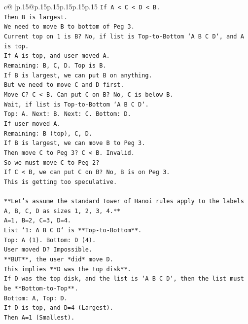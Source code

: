 \documentclass{article}
\begin{document}
{\begin{supertabular}{c@{$\;$}|p{.15\linewidth}@{}p{.15\linewidth}p{.15\linewidth}p{.15\linewidth}p{.15\linewidth}p{.15\linewidth}}
{{{\texttt{If A < C < D < B.} \\
\texttt{Then B is largest.} \\
\texttt{We need to move B to bottom of Peg 3.} \\
\texttt{Current top on 1 is B? No, if list is Top{-}to{-}Bottom `A B C D`, and A is top.} \\
\texttt{If A is top, and user moved A.} \\
\texttt{Remaining: B, C, D. Top is B.} \\
\texttt{If B is largest, we can put B on anything.} \\
\texttt{But we need to move C and D first.} \\
\texttt{Move C? C < B. Can put C on B? No, C is below B.} \\
\texttt{Wait, if list is Top{-}to{-}Bottom `A B C D`.} \\
\texttt{Top: A. Next: B. Next: C. Bottom: D.} \\
\texttt{If user moved A.} \\
\texttt{Remaining: B (top), C, D.} \\
\texttt{If B is largest, we can move B to Peg 3.} \\
\texttt{Then move C to Peg 3? C < B. Invalid.} \\
\texttt{So we must move C to Peg 2?} \\
\texttt{If C < B, we can put C on B? No, B is on Peg 3.} \\
\texttt{This is getting too speculative.} \\
\\ 
\texttt{**Let's assume the standard Tower of Hanoi rules apply to the labels A, B, C, D as sizes 1, 2, 3, 4.**} \\
\texttt{A=1, B=2, C=3, D=4.} \\
\texttt{List `1: A B C D` is **Top{-}to{-}Bottom**.} \\
\texttt{Top: A (1). Bottom: D (4).} \\
\texttt{User moved D? Impossible.} \\
\texttt{**BUT**, the user *did* move D.} \\
\texttt{This implies **D was the top disk**.} \\
\texttt{If D was the top disk, and the list is `A B C D`, then the list must be **Bottom{-}to{-}Top**.} \\
\texttt{Bottom: A, Top: D.} \\
\texttt{If D is top, and D=4 (Largest).} \\
\texttt{Then A=1 (Smallest).} \\
}}}
\end{supertabular}}
\end{document}

